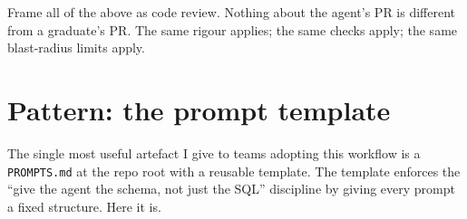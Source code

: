 \documentclass[
  11pt,
  british,
  oneside]{book}
\begin{document}
Frame all of the above as code review. Nothing about the agent's PR is
different from a graduate's PR. The same rigour applies; the same checks
apply; the same blast-radius limits apply.

\hypertarget{pattern-the-prompt-template}{%
\section{Pattern: the prompt
template}\label{pattern-the-prompt-template}}

The single most useful artefact I give to teams adopting this workflow
is a \texttt{PROMPTS.md} at the repo root with a reusable template. The
template enforces the ``give the agent the schema, not just the SQL''
discipline by giving every prompt a fixed structure. Here it is.
\end{document}
